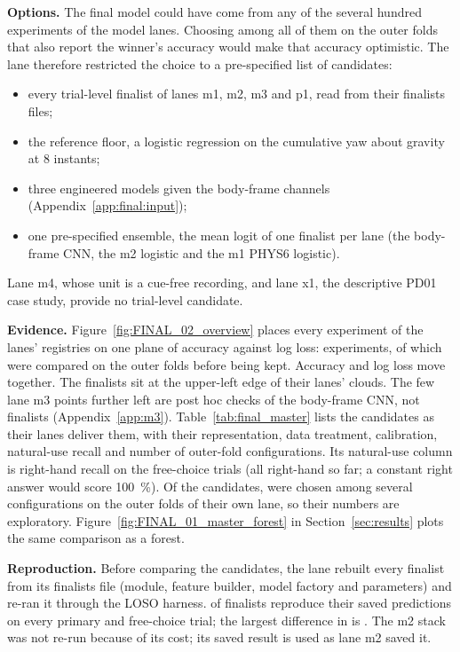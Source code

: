 \textbf{Options.}
The final model could have come from any of the several hundred experiments of the model lanes.
Choosing among all of them on the outer folds that also report the winner's accuracy would make that accuracy optimistic.
The lane therefore restricted the choice to a pre-specified list of  candidates:
\begin{itemize}[nosep]
  \item every trial-level finalist of lanes m1, m2, m3 and p1, read from their finalists files;
  \item the reference floor, a logistic regression on the cumulative yaw about gravity at 8 instants;
  \item three engineered models given the body-frame channels (Appendix~\ref{app:final:input});
  \item one pre-specified ensemble, the mean logit of one finalist per lane (the body-frame CNN, the m2 logistic and the m1 PHYS6 logistic).
\end{itemize}
Lane m4, whose unit is a cue-free recording, and lane x1, the descriptive PD01 case study, provide no trial-level candidate.

\textbf{Evidence.}
Figure~\ref{fig:FINAL_02_overview} places every experiment of the lanes' registries on one plane of accuracy against log loss:  experiments, of which  were compared on the outer folds before being kept.
Accuracy and log loss move together.
The finalists sit at the upper-left edge of their lanes' clouds.
The few lane m3 points further left are post hoc checks of the body-frame CNN, not finalists (Appendix~\ref{app:m3}).
Table~\ref{tab:final_master} lists the candidates as their lanes deliver them, with their representation, data treatment, calibration, natural-use recall and number of outer-fold configurations.
Its natural-use column is right-hand recall on the free-choice trials (all right-hand so far; a constant right answer would score 100~\%).
Of the  candidates,  were chosen among several configurations on the outer folds of their own lane, so their numbers are exploratory.
Figure~\ref{fig:FINAL_01_master_forest} in Section~\ref{sec:results} plots the same comparison as a forest.

\textbf{Reproduction.}
Before comparing the candidates, the lane rebuilt every finalist from its finalists file (module, feature builder, model factory and parameters) and re-ran it through the LOSO harness.
 of  finalists reproduce their saved predictions on every primary and free-choice trial; the largest difference in \pright{} is .
The m2 stack was not re-run because of its cost; its saved result is used as lane m2 saved it.

